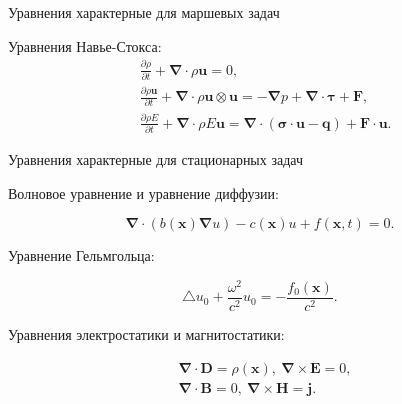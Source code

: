 \documentclass[10pt,xcolor=pst,aspectratio=169]{beamer}
\begin{document}
\begin{frame}{Уравнения характерные для маршевых задач}

    \transdissolve[duration=0.1]
    \justifying
    \large

    Уравнения Навье-Стокса:
    \[
        \begin{split}
            &\frac{\partial \rho}{\partial t}
                + \bm{\nabla} \cdot \rho \mathbf{u}
                = 0, \\
            &\frac{\partial \rho \mathbf{u}}{\partial t}
                + \bm{\nabla} \cdot \rho \mathbf{u} \otimes \mathbf{u}
                =
                - \bm{\nabla} p
                + \bm{\nabla} \cdot \bm{\tau}
                + \mathbf{F}, \\
            &\frac{\partial \rho E}{\partial t}
                + \bm{\nabla} \cdot \rho E \mathbf{u}
                =
                \bm{\nabla} \cdot \left( \bm{\sigma} \cdot \mathbf{u} - \mathbf{q} \right)
                + \mathbf{F} \cdot \mathbf{u}.
            \end{split}
    \]

\end{frame}

\begin{frame}{Уравнения характерные для стационарных задач}

    \transdissolve[duration=0.1]
    \justifying
    \large

    Волновое уравнение и уравнение диффузии:
   
    \[
        \bm{\nabla} \cdot \left( b(\mathbf{x}) \bm{\nabla} u \right) - c(\mathbf{x}) u + f(\mathbf{x}, t) = 0.
    \]

    Уравнение Гельмгольца:

    \[
        \triangle u_{0} + \frac{\omega^{2}}{c^2} u_{0} = - \frac{f_{0}(\mathbf{x})}{c^{2}}.
    \]

    Уравнения электростатики и магнитостатики:

    \[
        \begin{split}
            &\bm{\nabla} \cdot \mathbf{D} = \rho (\mathbf{x}), \:
            \bm{\nabla} \times \mathbf{E} = 0, \\
            &\bm{\nabla} \cdot \mathbf{B} = 0, \:
            \bm{\nabla} \times \mathbf{H} = \mathbf{j}.
        \end{split}
    \]

\end{frame}
\end{document}
